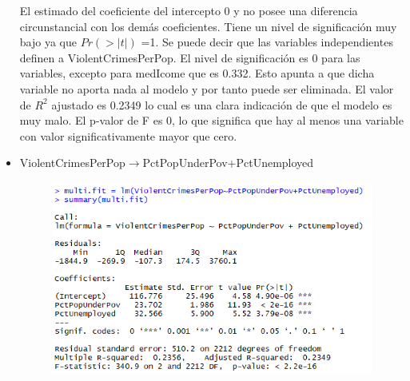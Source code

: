 \documentclass[a4paper,10pt,twocolumn]{article}
\begin{document}
\begin{itemize}
	El estimado del coeficiente del intercepto 0 y no posee una diferencia circunstancial con los demás coeficientes. Tiene un nivel de significación muy bajo ya que  $Pr(> | t | )$ =1.
	Se puede decir que las variables independientes definen a ViolentCrimesPerPop. El nivel de significación es 0 para las variables, excepto para medIcome que es 0.332. Esto apunta a que dicha variable no aporta nada al modelo y por tanto puede ser eliminada. El valor de $R^2$ ajustado es 0.2349 lo cual es una clara indicación de que el modelo es muy malo. El p-valor de F es 0, lo que significa que hay al menos una variable con valor significativamente mayor que cero.

	\item {ViolentCrimesPerPop$\rightarrow$PctPopUnderPov+PctUnemployed}





		\begin{figure}[H]
			\begin{center}
				\includegraphics[width=.92\columnwidth,right]{figures/multifit2.png}
			\end{center}
		\end{figure}


\end{itemize}
\end{document}
